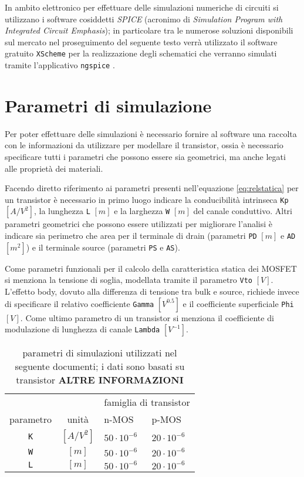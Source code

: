 	\vspace{3mm}
	
	In ambito elettronico per effettuare delle simulazioni numeriche di circuiti si utilizzano i software cosiddetti \textit{SPICE} (acronimo di \textit{Simulation Program with Integrated Circuit Emphasis}); in particolare tra le numerose soluzioni disponibili sul mercato nel proseguimento del seguente testo verrà utilizzato il software gratuito \texttt{XScheme} \cite{xschem} per la realizzazione degli schematici che verranno simulati tramite l'applicativo \texttt{ngspice} \cite{ngspice}.
	
\section{Parametri di simulazione}
	Per poter effettuare delle simulazioni è necessario fornire al software una raccolta con le informazioni da utilizzare per modellare il transistor, ossia è necessario specificare tutti i parametri che possono essere sia geometrici, ma anche legati alle proprietà dei materiali. 
	
	Facendo diretto riferimento ai parametri presenti nell'equazione \ref{eq:relstatica} per un transistor è necessario in primo luogo indicare la conducibilità intrinseca \texttt{Kp} $[A/V^2]$, la lunghezza \texttt{L} $[m]$  e la larghezza \texttt{W} $[m]$  del canale conduttivo. Altri parametri geometrici che possono essere utilizzati per migliorare l'analisi è indicare sia perimetro che area per il terminale di drain (parametri \texttt{PD} $[m]$ e \texttt{AD} $[m^2]$) e il terminale source (parametri \texttt{PS} e \texttt{AS}).
	
	Come parametri funzionali per il calcolo della caratteristica statica dei MOSFET si menziona la tensione di soglia, modellata tramite il parametro \texttt{Vto} $[V]$. L'effetto body, dovuto alla differenza di tensione tra bulk e source, richiede invece di specificare il relativo coefficiente \texttt{Gamma} $\left[V^{0.5}\right]$ e il coefficiente superficiale \texttt{Phi} $[V]$. Come ultimo parametro di un transistor si menziona il coefficiente di modulazione di lunghezza di canale \texttt{Lambda} $\left[V^{-1}\right]$.
	
	\begin{table}[bht]
		
		\centering
		\begin{tabular}{ c c | p{2cm}  p{2cm}}
			& & \multicolumn{2}{c}{famiglia di transistor }  \\
			parametro & unità & n-MOS & p-MOS \\ \hline 
			\texttt{K} & $[A/V^2]$ & $50\cdot 10^{-6}$ & $20\cdot 10^{-6}$ \\
			\texttt{W} & $[m]$ & $50\cdot 10^{-6}$ & $20\cdot 10^{-6}$ \\
			\texttt{L} & $[m]$ & $50\cdot 10^{-6}$ & $20\cdot 10^{-6}$ \\
		\end{tabular}
		\caption{parametri di simulazioni utilizzati nel seguente documenti; i dati sono basati su transistor \textbf{ALTRE INFORMAZIONI}}
		
		
	\end{table}


